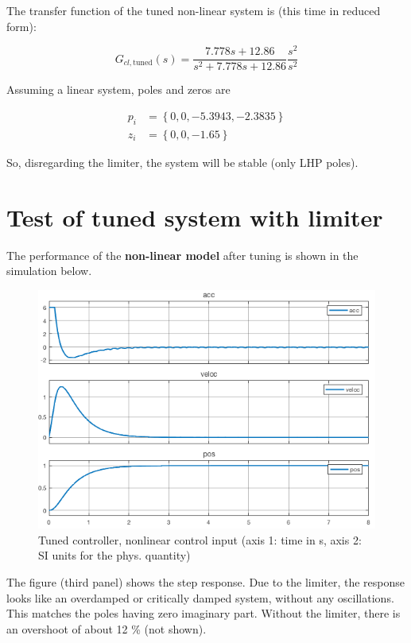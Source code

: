 \documentclass[a4paper]{report}
\begin{document}
The transfer function of the tuned non-linear system is (this time in reduced form):

\begin{equation} \label{eq:PD_1d_tf_num_tuned}
G_{cl, \text{tuned}}(s) = \frac{7.778 s + 12.86}{s^2 + 7.778 s + 12.86} \frac{s^2}{s^2}
\end{equation}

Assuming a linear system, poles and zeros are

\begin{align*}
p_i &= \left\lbrace 0, 0, -5.3943, -2.3835 \right\rbrace \\
z_i &= \left\lbrace 0,0,-1.65 \right\rbrace
\end{align*}

So, disregarding the limiter, the system will be stable (only \gls{LHP} poles).

\section{Test of tuned system with limiter}
The performance of the \textbf{non-linear model} after tuning is shown in the simulation below.

\begin{figure}[H]
\centering
\includegraphics[width=12cm]{img/simulink_1d_sim3.png}
\caption{Tuned controller, nonlinear control input (axis 1: time in \si{\second}, axis 2: SI units for the phys. quantity)\label{fig:simulink_1d_sim3}}
\end{figure}

The figure (third panel) shows the step response. 
Due to the limiter, the response looks like an overdamped or critically damped system, without any oscillations. This matches the poles having zero imaginary part.
Without the limiter, there is an overshoot of about 12 \% (not shown).
\end{document}
